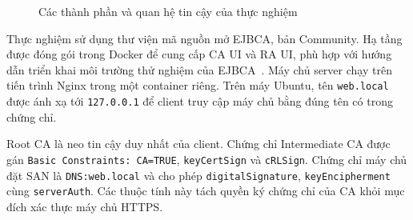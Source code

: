 \documentclass[11pt,a4paper]{article}
\begin{document}
\begin{figure}[H]
    \centering
    \caption{Các thành phần và quan hệ tin cậy của thực nghiệm}
    \label{fig:experiment-architecture}
\end{figure}

Thực nghiệm sử dụng thư viện mã nguồn mở EJBCA, bản Community. Hạ tầng được
đóng gói trong Docker để cung cấp CA UI và RA UI, phù hợp với hướng dẫn
triển khai môi trường thử nghiệm của EJBCA~\cite{EJBCAContainerQuickStart}.
Máy chủ server chạy trên tiến trình Nginx trong một container riêng.
Trên máy Ubuntu, tên \texttt{web.local} được ánh xạ tới \texttt{127.0.0.1}
để client truy cập máy chủ bằng đúng tên có trong chứng chỉ.

Root CA là neo tin cậy duy nhất của client. Chứng chỉ Intermediate CA
được gán \texttt{Basic Constraints: CA=TRUE}, \texttt{keyCertSign} và
\texttt{cRLSign}. Chứng chỉ máy chủ đặt SAN là \texttt{DNS:web.local}
và cho phép \texttt{digitalSignature}, \texttt{keyEncipherment} cùng
\texttt{serverAuth}. Các thuộc tính này tách quyền ký chứng chỉ của CA
khỏi mục đích xác thực máy chủ HTTPS.
\end{document}
